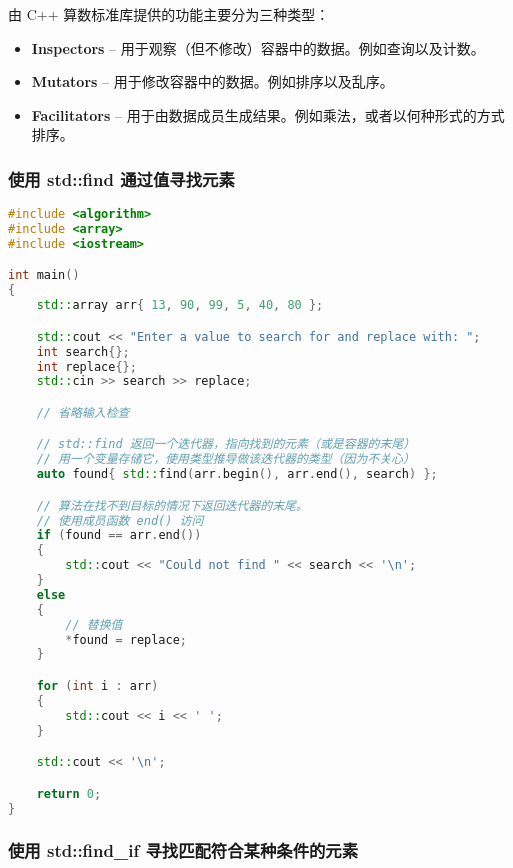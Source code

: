 \documentclass[../../LearnCpp.tex]{subfiles}
\begin{document}

由 C++ 算数标准库提供的功能主要分为三种类型：

\begin{itemize}
    \item \textbf{Inspectors} -- 用于观察（但不修改）容器中的数据。例如查询以及计数。
    \item \textbf{Mutators} -- 用于修改容器中的数据。例如排序以及乱序。
    \item \textbf{Facilitators} -- 用于由数据成员生成结果。例如乘法，或者以何种形式的方式排序。
\end{itemize}

\subsubsection*{使用 std::find 通过值寻找元素}

\begin{lstlisting}[language=C++]
#include <algorithm>
#include <array>
#include <iostream>

int main()
{
    std::array arr{ 13, 90, 99, 5, 40, 80 };

    std::cout << "Enter a value to search for and replace with: ";
    int search{};
    int replace{};
    std::cin >> search >> replace;

    // 省略输入检查

    // std::find 返回一个迭代器，指向找到的元素（或是容器的末尾）
    // 用一个变量存储它，使用类型推导做该迭代器的类型（因为不关心）
    auto found{ std::find(arr.begin(), arr.end(), search) };

    // 算法在找不到目标的情况下返回迭代器的末尾。
    // 使用成员函数 end() 访问
    if (found == arr.end())
    {
        std::cout << "Could not find " << search << '\n';
    }
    else
    {
        // 替换值
        *found = replace;
    }

    for (int i : arr)
    {
        std::cout << i << ' ';
    }

    std::cout << '\n';

    return 0;
}
\end{lstlisting}

\subsubsection*{使用 std::find\_if 寻找匹配符合某种条件的元素}
\end{document}
